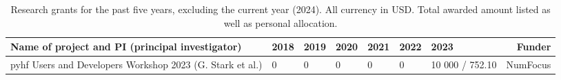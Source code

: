 \begin{table}[h!]
	\footnotesize
	\centering
	\caption{Research grants for the past five years, excluding the current year (2024). All currency in USD. Total awarded amount listed as well as personal allocation.\label{tab:grants}}
	\begin{tabular}{p{8em}|p{4em}|p{4em}|p{4em}|p{4em}|p{4em}|p{4em}|r}
		\rowcolor{black!30}
		\textbf{Name of project and PI (principal investigator)}  & \textbf{2018} & \textbf{2019} & \textbf{2020} & \textbf{2021} & \textbf{2022} & \textbf{2023}   & \textbf{Funder} \\
		\hline
		pyhf Users and Developers Workshop 2023 (G. Stark et al.) & 0             & 0             & 0             & 0             & 0             & 10 000 / 752.10 & NumFocus        \\
	\end{tabular}
\end{table}

